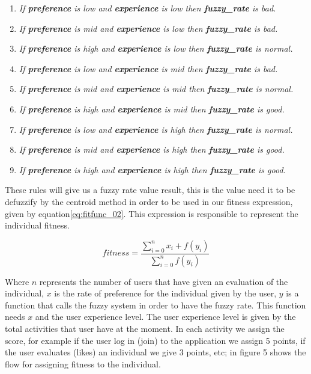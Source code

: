\begin{enumerate}
	\item \textit{If \textbf{preference} is low and
		\textbf{experience} is low then \textbf{fuzzy\_rate} is bad.}
	\item \textit{If \textbf{preference} is mid and
		\textbf{experience} is low  then \textbf{fuzzy\_rate} is bad.}
	\item \textit{If \textbf{preference} is high and
		\textbf{experience} is low  then \textbf{fuzzy\_rate} is normal.}
	\item \textit{If \textbf{preference} is low and
		\textbf{experience} is mid then \textbf{fuzzy\_rate} is bad.}
	\item \textit{If \textbf{preference} is mid and
		\textbf{experience} is mid  then \textbf{fuzzy\_rate} is normal.}
	\item \textit{If \textbf{preference} is high and
		\textbf{experience} is mid  then \textbf{fuzzy\_rate} is good.}
	\item \textit{If \textbf{preference} is low and
		\textbf{experience} is high then \textbf{fuzzy\_rate} is normal.}
	\item \textit{If \textbf{preference} is mid and
		\textbf{experience} is high  then \textbf{fuzzy\_rate} is good.}
	\item \textit{If \textbf{preference} is high and
		\textbf{experience} is high  then \textbf{fuzzy\_rate} is good.}

\end{enumerate}

These rules will give us a fuzzy rate value result, this is the value need it to
be defuzzify by the centroid method in order to be used in our fitness
expression, given by equation\ref{eq:fitfunc_02}. This expression is responsible
to represent the individual fitness.

\begin{equation}\label{eq:fitfunc_02}
\displaystyle fitness=\frac{\sum_{i=0}^{n}x_{i}+f(y_{i})}{\sum_{i=0}^{n}f(y_{i})}
\end{equation}

Where $n$ represents  the number of  users that  have given an evaluation of the
individual, $x$ is the rate of preference for the  individual  given by  the user,
$y$ is a function that calls the fuzzy system in order to have the fuzzy rate.
This function needs $x$ and the user experience level. The user experience level
is given  by the  total activities that user have at the moment. In each
activity we assign the score, for example if the user log in (join) to the
application we assign 5 points, if the user evaluates (likes) an individual we
give 3 points, etc; in figure 5 shows the flow for assigning fitness to
the individual.
